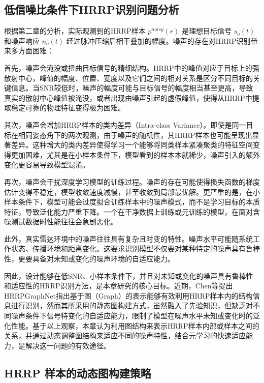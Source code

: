 \subsection{低信噪比条件下HRRP识别问题分析}
\label{subsec:noise_challenge_analysis}

根据第二章的分析，实际观测到的HRRP样本 $p^{noisy}(r)$ 是理想目标信号 $s_o(t)$ 和噪声响应 $n_o(t)$ 经过脉冲压缩后相干叠加的幅度。噪声的存在对HRRP识别带来多方面困难：

首先，噪声会淹没或扭曲目标信号的精细结构。HRRP中的峰值对应于目标上的强散射中心，峰值的幅度、位置、宽度以及它们之间的相对关系是区分不同目标的关键信息。当SNR较低时，噪声的幅度可能与目标信号的幅度相当甚至更高，导致真实的散射中心峰值被淹没，或者出现由噪声引起的虚假峰值，使得从HRRP中提取稳定可靠的物理特征变得极为困难。

其次，噪声会增加HRRP样本的类内差异（Intra-class Variance）。即使是同一目标在相同姿态角下的两次观测，由于噪声的随机性，其HRRP样本也可能呈现出显著差异。这种增大的类内差异使得学习一个能够将同类样本紧凑聚类的特征空间变得更加困难，尤其是在小样本条件下，模型看到的样本本就稀少，噪声引入的额外变化更容易导致模型混淆。

再次，噪声会干扰深度学习模型的训练过程。噪声的存在可能使得损失函数的梯度估计变得不稳定，模型收敛速度减慢，甚至收敛到局部最优解。更严重的是，在小样本条件下，模型可能会过度拟合训练样本中的噪声模式，而不是学习目标的本质特征，导致泛化能力严重下降。一个在干净数据上训练或元训练的模型，在面对含噪测试数据时性能往往会急剧恶化。

此外，真实雷达环境中的噪声往往具有复杂且时变的特性。噪声水平可能随系统工作状态、传播环境和距离变化。这要求识别模型不仅要对某种特定的噪声具有鲁棒性，更要具备对未知或变化的噪声环境的自适应能力。

因此，设计能够在低SNR、小样本条件下，并且对未知或变化的噪声具有鲁棒性和适应性的HRRP识别方法，是本章研究的核心目标。近期，Chen等提出HRRPGraphNet指出基于图（Graph）的表示能够有效利用HRRP样本内的结构信息进行识别，然而其所采用的静态图构建方式，虽然融入了先验知识，但缺乏对不同噪声条件下信号特变化的自适应能力，限制了模型在噪声水平未知或变化时的泛化性能。基于以上观察，本章认为利用图结构来表示HRRP样本内部或样本之间的关系，并通过动态调整图结构来适应不同的噪声特性，结合元学习的快速适应能力，是解决这一问题的有效途径。

\subsection{HRRP 样本的动态图构建策略}
\label{subsec:dynamic_graph_construction}

